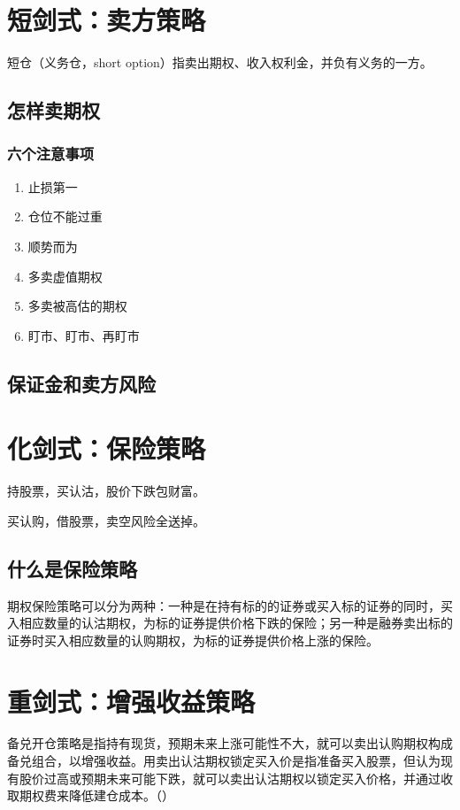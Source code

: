 \documentclass{article}
\begin{document}
\section{短剑式：卖方策略}
短仓（义务仓，short option）指卖出期权、收入权利金，并负有义务的一方。
\subsection{怎样卖期权}
\subsubsection*{六个注意事项}
\begin{enumerate}
    \item 止损第一
    \item 仓位不能过重
    \item 顺势而为
    \item 多卖虚值期权
    \item 多卖被高估的期权
    \item 盯市、盯市、再盯市
\end{enumerate}
\subsection{保证金和卖方风险}
\section{化剑式：保险策略}
持股票，买认沽，股价下跌包财富。

买认购，借股票，卖空风险全送掉。

\subsection{什么是保险策略}
期权保险策略可以分为两种：一种是在持有标的的证券或买入标的证券的同时，买入相应数量的认沽期权，为标的证券提供价格下跌的保险；另一种是融券卖出标的证券时买入相应数量的认购期权，为标的证券提供价格上涨的保险。
\section{重剑式：增强收益策略}
备兑开仓策略是指持有现货，预期未来上涨可能性不大，就可以卖出认购期权构成备兑组合，以增强收益。用卖出认沽期权锁定买入价是指准备买入股票，但认为现有股价过高或预期未来可能下跌，就可以卖出认沽期权以锁定买入价格，并通过收取期权费来降低建仓成本。（\textbf{}）
\section{}
\section{}
\end{document}
